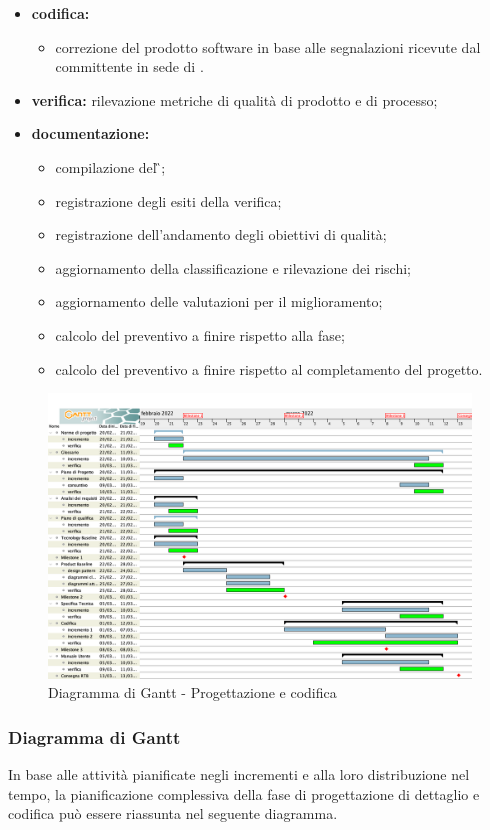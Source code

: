 \begin{itemize}
	\item \textbf{codifica:} 
			\begin{itemize}
				\item correzione del prodotto software in base alle segnalazioni ricevute dal committente in sede di \PB{}.
			\end{itemize}
 	\item \textbf{verifica:} rilevazione metriche di qualità di prodotto e di processo;
	\item \textbf{documentazione:} 
	 \begin{itemize}
		\item compilazione del \G{};
  		\item registrazione degli esiti della verifica;
     	\item registrazione dell’andamento degli obiettivi di qualità;
      	\item aggiornamento della classificazione e rilevazione dei rischi;
		\item aggiornamento delle valutazioni per il miglioramento; 
		\item calcolo del preventivo a finire rispetto alla fase;
		\item calcolo del preventivo a finire rispetto al completamento del progetto.
	 \end{itemize}
\end{itemize}

\begin{figure}[H]
	\centering
	\includegraphics[scale=0.35]{Sezioni/gantt/progettazione_codifica.png}
	\caption{Diagramma di Gantt - Progettazione e codifica}
\end{figure}


\subsubsection{Diagramma di Gantt}
In base alle attività pianificate negli incrementi e alla loro distribuzione nel tempo, la pianificazione complessiva della fase di progettazione di dettaglio e codifica può essere riassunta nel seguente diagramma.




